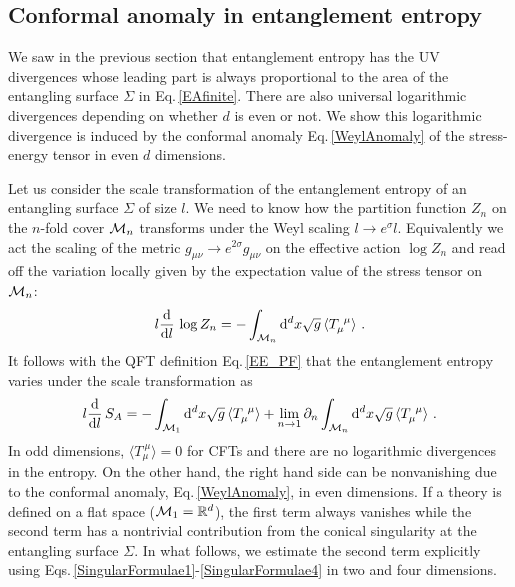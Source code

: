 \subsection{Conformal anomaly in entanglement entropy}
We saw in the previous section that entanglement entropy has the UV divergences whose leading part is always proportional to the area of the entangling surface $\Sigma$ in Eq.\,\eqref{EAfinite}.
There are also universal logarithmic divergences depending on whether $d$ is even or not.
We show this logarithmic divergence is induced by the conformal anomaly Eq.\,\eqref{WeylAnomaly} of the stress-energy tensor in even $d$ dimensions.

Let us consider the scale transformation of the entanglement entropy of an entangling surface $\Sigma$ of size $l$.
We need to know how the partition function $Z_n$ on the $n$-fold cover ${\cal M}_n$ transforms under the Weyl scaling $l \to e^{\sigma} l$.
Equivalently we act the scaling of the metric $g_{\mu\nu} \to e^{2\sigma}g_{\mu\nu}$ on the effective action $\log Z_n$ and read off the variation locally given by the expectation value of the stress tensor on ${\cal M}_n$:
\begin{align}
l \frac{\mathrm{d}}{\mathrm{d} l}\, \log Z_n = -\int_{{\cal M}_n} \mathrm{d}^d x \sqrt{g}\, \langle T_\mu^{~\mu} \rangle \ .
\end{align} 
It follows with the QFT definition Eq.\,\eqref{EE_PF} that the entanglement entropy varies under the scale transformation as
\begin{align}\label{EE_Weyl}
l \frac{\mathrm{d}}{\mathrm{d} l}\, S_A = -\int_{{\cal M}_1} \mathrm{d}^d x \sqrt{g}\, \langle T_\mu^{~\mu} \rangle + \lim_{n\to 1} \partial_n \int_{{\cal M}_n} \mathrm{d}^d x \sqrt{g}\, \langle T_\mu^{~\mu} \rangle \ .
\end{align}
In odd dimensions, $\langle T_\mu^{~\mu} \rangle = 0$ for CFTs and there are no logarithmic divergences in the entropy.
On the other hand, the right hand side can be nonvanishing due to the conformal anomaly, Eq.\,\eqref{WeylAnomaly}, in even dimensions.
If a theory is defined on a flat space (${\cal M}_1 = \mathbb{R}^d$), the first term always vanishes while the second term has a nontrivial contribution from the conical singularity at the entangling surface $\Sigma$.
In what follows, we estimate the second term explicitly using Eqs.\,\eqref{SingularFormulae1}-\eqref{SingularFormulae4} in two and four dimensions.

